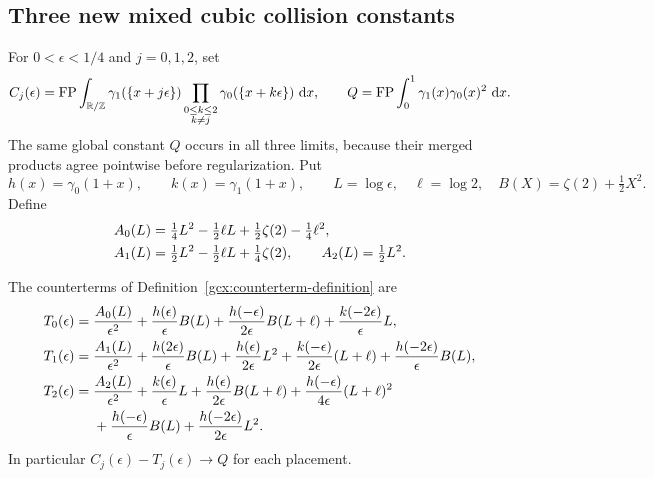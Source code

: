 \subsection{Three new mixed cubic collision constants}
\label{gcx:cubic}

For $0<\epsilon<1/4$ and $j=0,1,2$, set
\begin{equation}\label{gcx:Cj}
 C_j(\epsilon)=\operatorname{FP}\int_{\mathbb R/\mathbb Z}
  \gamma_1(\{x+j\epsilon\})
  \prod_{\substack{0\le k\le2\\ k\ne j}}
       \gamma_0(\{x+k\epsilon\})\,\,\mathrm d x,
 \qquad
 Q=\operatorname{FP}\int_0^1\gamma_1(x)\gamma_0(x)^2\,\,\mathrm d x.
\end{equation}
The same global constant $Q$ occurs in all three limits, because their
merged products agree pointwise before regularization.  Put
\[
 h(x)=\gamma_0(1+x),\qquad k(x)=\gamma_1(1+x),\qquad
 L=\log\epsilon,\quad \ell=\log2,\quad
 B(X)=\zeta(2)+\tfrac12X^2.
\]
Define
\begin{align}
 A_0(L)&=\tfrac14L^2-\tfrac12\ell L
                    +\tfrac12\zeta(2)-\tfrac14\ell^2,\notag\\
 A_1(L)&=\tfrac12L^2-\tfrac12\ell L+\tfrac14\zeta(2),
 \qquad A_2(L)=\tfrac12L^2.
 \label{gcx:Aj}
\end{align}

\begin{proposition}
\label{gcx:three-T}
The counterterms of Definition~\ref{gcx:counterterm-definition} are
\begin{align}
 T_0(\epsilon)={}&\frac{A_0(L)}{\epsilon^2}
  +\frac{h(\epsilon)}\epsilon B(L)
  +\frac{h(-\epsilon)}{2\epsilon}B(L+\ell)
  +\frac{k(-2\epsilon)}\epsilon L,\label{gcx:T0}\\
 T_1(\epsilon)={}&\frac{A_1(L)}{\epsilon^2}
  +\frac{h(2\epsilon)}\epsilon B(L)
  +\frac{h(\epsilon)}{2\epsilon}L^2
  +\frac{k(-\epsilon)}{2\epsilon}(L+\ell)
  +\frac{h(-2\epsilon)}\epsilon B(L),\label{gcx:T1}\\
 T_2(\epsilon)={}&\frac{A_2(L)}{\epsilon^2}
  +\frac{k(\epsilon)}\epsilon L
  +\frac{h(\epsilon)}{2\epsilon}B(L+\ell)
  +\frac{h(-\epsilon)}{4\epsilon}(L+\ell)^2\notag\\
 &+\frac{h(-\epsilon)}\epsilon B(L)
  +\frac{h(-2\epsilon)}{2\epsilon}L^2.
 \label{gcx:T2}
\end{align}
In particular $C_j(\epsilon)-T_j(\epsilon)\to Q$ for each placement.
\end{proposition}

